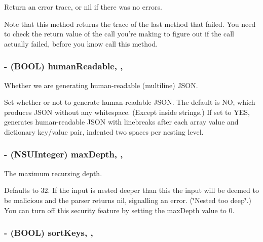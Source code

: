 Return an error trace, or nil if there was no errors. 

Note that this method returns the trace of the last method that failed. You need to check the return value of the call you're making to figure out if the call actually failed, before you know call this method. \hypertarget{interface_s_b_json_writer_a16ca84860a2ee76a03b567dc5181a851}{
\subsubsection[{human\-Readable}]{\setlength{\rightskip}{0pt plus 5cm}-\/ (B\-O\-O\-L) human\-Readable\hspace{0.3cm}{\ttfamily [read]}, {\ttfamily [write]}, {\ttfamily [atomic]}}}\label{interface_s_b_json_writer_a16ca84860a2ee76a03b567dc5181a851}


Whether we are generating human-\/readable (multiline) J\-S\-O\-N. 

Set whether or not to generate human-\/readable J\-S\-O\-N. The default is N\-O, which produces J\-S\-O\-N without any whitespace. (Except inside strings.) If set to Y\-E\-S, generates human-\/readable J\-S\-O\-N with linebreaks after each array value and dictionary key/value pair, indented two spaces per nesting level. \hypertarget{interface_s_b_json_writer_a283b4f65ab4d3e1a8112b37dea432689}{
\subsubsection[{max\-Depth}]{\setlength{\rightskip}{0pt plus 5cm}-\/ (N\-S\-U\-Integer) max\-Depth\hspace{0.3cm}{\ttfamily [read]}, {\ttfamily [write]}, {\ttfamily [atomic]}}}\label{interface_s_b_json_writer_a283b4f65ab4d3e1a8112b37dea432689}


The maximum recursing depth. 

Defaults to 32. If the input is nested deeper than this the input will be deemed to be malicious and the parser returns nil, signalling an error. (\char`\"{}\-Nested too deep\char`\"{}.) You can turn off this security feature by setting the max\-Depth value to 0. \hypertarget{interface_s_b_json_writer_af25807a58a322b56cb5d3593532228e5}{
\subsubsection[{sort\-Keys}]{\setlength{\rightskip}{0pt plus 5cm}-\/ (B\-O\-O\-L) sort\-Keys\hspace{0.3cm}{\ttfamily [read]}, {\ttfamily [write]}, {\ttfamily [atomic]}}}\label{interface_s_b_json_writer_af25807a58a322b56cb5d3593532228e5}


